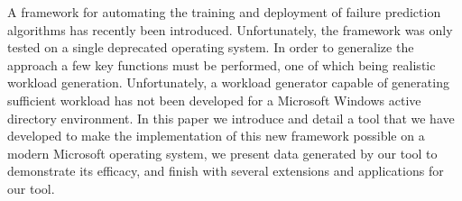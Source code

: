 A framework for automating the training and deployment of failure prediction
algorithms has recently been introduced.  Unfortunately, the framework was only
tested on a single deprecated operating system.  In order to generalize the
approach a few key functions must be performed, one of which being realistic
workload generation.  Unfortunately, a workload generator capable of generating
sufficient workload has not been developed for a Microsoft Windows active
directory environment.  In this paper we introduce and detail a tool that we
have developed to make the implementation of this new framework possible on a
modern Microsoft operating system, we present data generated by our tool to
demonstrate its efficacy, and finish with several extensions and applications
for our tool.
